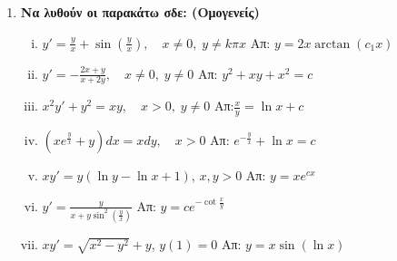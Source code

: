 \documentclass[a4paper,table]{report}
\begin{document}
\begin{enumerate}

    \item {\bfseries Να λυθούν οι παρακάτω σδε: (Ομογενείς)}
      \begin{enumerate}[i)]
        \item $y'=\frac{y}{x}+\sin(\frac{y}{x}), \quad x\neq 0,\; y\neq k\pi x$ 
          \hfill Απ: $y=2x\arctan(c_{1}x)$
        \item $y'=-\frac{2x+y}{x+2y}, \quad x\neq 0,\; y\neq 0$  
          \hfill Απ: $y^{2}+xy+x^{2}=c$
        \item $x^{2}y'+y^{2}=xy, \quad x>0,\; y\neq 0$ \hfill Απ:$\frac{x}{y}=\ln x+c$
        \item $\left(xe^{\frac{y}{x}}+y\right)dx=xdy, \quad x>0$ 
          \hfill Απ: $e^{-\frac{y}{x}}+\ln x =c$
        \item $ xy'=y(\ln{y} - \ln{x} +1) $, $ x,y>0 $ \hfill Απ: $ y=xe^{cx} $ 
        \item $ y' = \frac{y}{x+y \sin^{2}{(\frac{y}{x})}} $ 
          \hfill Απ: $ y=ce^{- \cot{\frac{x}{y} }} $  
        \item $ xy' = \sqrt{ x^{2}-y^{2} } +y $, \quad $ y(1)=0 $ 
          \hfill Απ: $ y = x \sin{(\ln{x})}$  
      \end{enumerate}


\end{enumerate}
\end{document}
